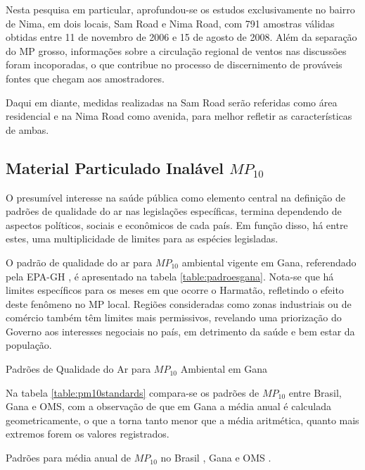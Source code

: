 Nesta pesquisa em particular, aprofundou-se os estudos exclusivamente no bairro
de Nima, em dois locais, Sam Road e Nima Road, com 791 amostras válidas obtidas
entre 11 de novembro de 2006 e 15 de agosto de 2008. Além da separação do MP 
grosso, informações sobre a circulação regional de ventos nas discussões foram 
incoporadas, o que contribue no processo de discernimento de prováveis fontes 
que chegam aos amostradores.

Daqui em diante, medidas realizadas na Sam Road serão referidas como área 
residencial e na Nima Road como avenida, para melhor refletir as características
de ambas.

\subsection{Material Particulado Inalável $MP_{10}$}

O presumível interesse na saúde pública como elemento central na definição de 
padrões de qualidade do ar nas legislações específicas, termina dependendo de
aspectos políticos, sociais e econômicos de cada país. Em função disso, há entre
estes, uma multiplicidade de limites para as espécies legisladas.

O padrão de qualidade do ar para $MP_{10}$ ambiental vigente em Gana, referendado
pela EPA-GH \citeyearpar{epa2015}, é apresentado na tabela 
\ref{table:padroesgana}. Nota-se que há limites específicos para os meses em que 
ocorre o Harmatão, refletindo o efeito deste fenômeno no MP local. 
Regiões consideradas como zonas industriais ou de comércio também têm limites 
mais permissivos, revelando uma priorização do Governo aos interesses negociais
no país, em detrimento da saúde e bem estar da população.

\begin{table}[H]
\centering
  
\caption{Padrões de Qualidade do Ar para $MP_{10}$ Ambiental em Gana
         \cite{epa2015} \label{table:padroesgana}}
\end{table}

Na tabela \ref{table:pm10standards} compara-se os padrões de $MP_{10}$ entre 
Brasil, Gana e OMS, com a observação de que em Gana a média anual é calculada 
geometricamente, o que a torna tanto menor que a média aritmética, quanto 
mais extremos forem os valores registrados.

\begin{table}[H]
\centering
  
  \caption{Padrões para média anual de $MP_{10}$ no Brasil \citep{conama1990}, 
           Gana \citep{epa2015} e OMS \citep{who}. \label{table:pm10standards}}
\end{table}


